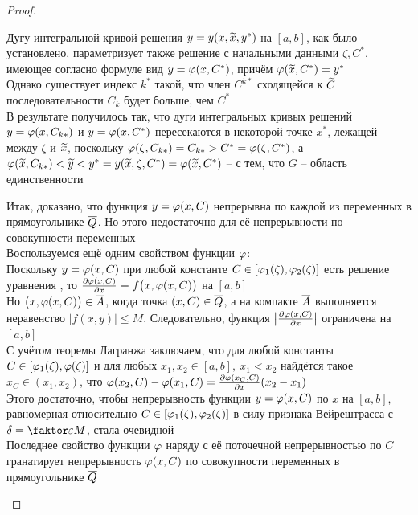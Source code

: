 \begin{proof}
\begin{enumerate}
\begin{itemize}
            Дугу интегральной кривой решения $ y = y(x, \widetilde{x}, y^*) $ на $ [a, b] $, как было установлено, параметризует также решение с начальными данными $ \zeta, C^* $, имеющее согласно формуле  вид $ y = \varphi(x, C^*) $, причём $ \varphi(\widetilde{x}, C^*) = y^* $ \\
            Однако существует индекс $ k^* $ такой, что член $ C^{k*} $ сходящейся к $ \widetilde{C} $ последовательности $ C_k $ будет больше, чем $ C^* $ \\
            В результате получилось так, что дуги интегральных кривых решений $ y = \varphi(x, C_{k*}) $ и $ y = \varphi(x, C^*) $ пересекаются в некоторой точке $ x^* $, лежащей между $ \zeta $ и $ \widetilde{x} $, поскольку $ \varphi(\zeta, C_{k*}) = C_{k*} > C^* = \varphi(\zeta, C^*) $, а $ \varphi(\widetilde{x}, C_{k*}) < \widetilde{y} < y^* = y(\widetilde{x}, \zeta, C^*) = \varphi(\widetilde{x}, C^*) $ -- \contra с тем, что $ G $ -- область единственности
        \end{itemize}
        Итак, доказано, что функция $ y = \varphi(x, C) $ непрерывна по каждой из переменных в прямоугольнике $ \overline{Q} $. Но этого недостаточно для её непрерывности по совокупности переменных \\
        Воспользуемся ещё одним свойством функции $ \varphi $: \\
        Поскольку $ y = \varphi(x, C) $ при любой константе $ C \in [\varphi_1(\zeta), \varphi_2(\zeta)] $ есть решение уравнения , то $ \pder{\vphi(x, C)}x \equiv f \big( x, \vphi(x, C) \big) $ на $ [a, b] $ \\
        Но $ \big( x, \varphi(x, C) \big) \in \overline{A} $, когда точка $ (x, C) \in \overline{Q} $, а на компакте $ \overline{A} $ выполняется неравенство $ |f(x, y)| \le M $. Следовательно, функция $ \big| \frac{\partial {\varphi(x, C)}}{\partial {x}} \big| $ ограничена на $ [a, b] $ \\
        С учётом теоремы Лагранжа заключаем, что для любой константы $ C \in [\varphi_1(\zeta), \varphi(\zeta)] $ и для любых $ x_1, x_2 \in [a, b], ~ x_1 < x_2 $ найдётся такое $ x_C \in (x_1, x_2) $, что $ \varphi(x_2, C) - \varphi(x_1, C) = \frac{\partial {\varphi(x_C, C)}}{\partial {x}}(x_2 - x_1) $ \\
        Этого достаточно, чтобы непрерывность функции $ y = \varphi(x, C) $ по $ x $ на $ [a, b] $, равномерная относительно $ C \in [\varphi_1(\zeta), \varphi_2(\zeta)] $ в силу признака Вейрештрасса с $ \delta = \faktor\veps{M} $, стала очевидной \\
        Последнее свойство функции $ \varphi $ наряду с её поточечной непрерывностью по $ C $ гранатирует непрерывность $ \varphi(x, C) $ по совокупности переменных в прямоугольнике $ \overline{Q} $ \\

\end{enumerate}
\end{proof}
